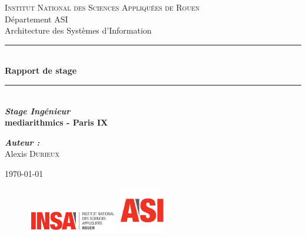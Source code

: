 \begin{titlepage}
    \newcommand{\HRule}{\rule{\linewidth}{0.5mm}} 
    \center 
    \textsc{\huge Institut National des Sciences Appliquées de Rouen}\\[0.7cm] 
    \LARGE Département ASI~\\[0.5cm]
    \Large{Architecture des Systèmes d'Information} ~\\[1.5cm]
    
    \HRule \\[0.4cm]
    { \huge \bfseries Rapport de stage}\\[0.2cm] \HRule \\[1.5cm]
     
    \LARGE \emph{\textbf{Stage Ingénieur}} \\
    \textbf{mediarithmics - Paris IX}\\[2cm]
    
    \large
    \begin{minipage}[c]{.3\linewidth}
        \begin{center}
           \emph{\textbf{Auteur :}}\\
            Alexis \textsc{Durieux}\\
        \end{center}
    \end{minipage} \hfill
    
    \vfill{\today} 
    
    \begin{figure}
    \includegraphics[width=4cm]{images/insa.jpg}\hfill
    \includegraphics[width=2cm]{images/asi.jpeg}
    \end{figure}
    
    
     \end{titlepage}
    